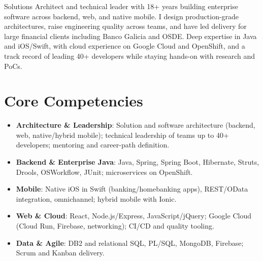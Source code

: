 \documentclass[11pt,a4paper,sans]{moderncv}
\begin{document}
\makecvtitle


\vspace{6pt}
\small{Solutions Architect and technical leader with 18+ years building enterprise software across backend, web, and native mobile. I design production-grade architectures, raise engineering quality across teams, and have led delivery for large financial clients including Banco Galicia and OSDE. Deep expertise in Java and iOS/Swift, with cloud experience on Google Cloud and OpenShift, and a track record of leading 40+ developers while staying hands-on with research and PoCs.}


\section{Core Competencies}
\vspace{1pt}
\begin{itemize}

\item \textbf{Architecture \& Leadership}: Solution and software architecture (backend, web, native/hybrid mobile); technical leadership of teams up to 40+ developers; mentoring and career-path definition.

\item \textbf{Backend \& Enterprise Java}: Java, Spring, Spring Boot, Hibernate, Struts, Drools, OSWorkflow, JUnit; microservices on OpenShift.

\item \textbf{Mobile}: Native iOS in Swift (banking/homebanking apps), REST/OData integration, omnichannel; hybrid mobile with Ionic.

\item \textbf{Web \& Cloud}: React, Node.js/Express, JavaScript/jQuery; Google Cloud (Cloud Run, Firebase, networking); CI/CD and quality tooling.

\item \textbf{Data \& Agile}: DB2 and relational SQL, PL/SQL, MongoDB, Firebase; Scrum and Kanban delivery.

\end{itemize}

\end{document}
